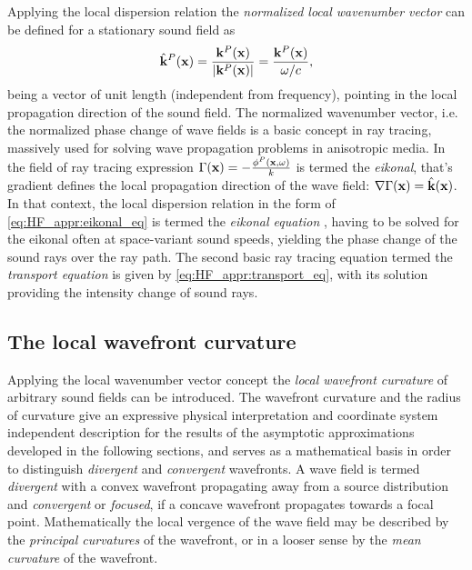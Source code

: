 Applying the local dispersion relation the \emph{normalized local wavenumber vector} can be defined for a stationary sound field as
\begin{equation}
\hat{\mathbf{k}}^P(\mathbf{x}) = \frac{\mathbf{k}^P(\mathbf{x})}{|\mathbf{k}^P(\mathbf{x})|} = \frac{\mathbf{k}^P(\mathbf{x})}{\omega/c},
\end{equation}
being a vector of unit length (independent from frequency), pointing in the local propagation direction of the sound field.
%
The normalized wavenumber vector, i.e. the normalized phase change of wave fields is a basic concept in ray tracing, massively used for solving wave propagation problems in anisotropic media.
In the field of ray tracing expression $\Gamma(\mathbf{x}) = -\frac{\phi^P(\mathbf{x},\omega)}{k}$ is termed the \emph{eikonal}, that's gradient defines the local propagation direction of the wave field: $\nabla \Gamma(\mathbf{x}) = \hat{\mathbf{k}}(\mathbf{x})$.
In that context, the local dispersion relation in the form of \eqref{eq:HF_appr:eikonal_eq} is termed the \emph{eikonal equation} \cite{Kinsler2000, Pierce1991}, having to be solved for the eikonal often at space-variant sound speeds, yielding the phase change of the sound rays over the ray path.
The second basic ray tracing equation termed the \emph{transport equation} is given by \eqref{eq:HF_appr:transport_eq}, with its solution providing the intensity change of sound rays.

\subsection{The local wavefront curvature}
%
Applying the local wavenumber vector concept the \emph{local wavefront curvature} of arbitrary sound fields can be introduced.
The wavefront curvature and the radius of curvature give an expressive physical interpretation and coordinate system independent description for the results of the asymptotic approximations developed in the following sections, and serves as a mathematical basis in order to distinguish \emph{divergent} and \emph{convergent} wavefronts.
A wave field is termed \emph{divergent} with a convex wavefront propagating away from a source distribution and \emph{convergent} or \emph{focused}, if a concave wavefront propagates towards a focal point.
Mathematically the local vergence of the wave field may be described by the \emph{principal curvatures} of the wavefront, or in a looser sense by the \emph{mean curvature} of the wavefront.


